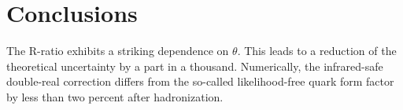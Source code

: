 \section{Conclusions}\label{sec:conclusions}

The R-ratio exhibits a striking dependence on $\theta$. This leads to a
reduction of the theoretical uncertainty by a part in a thousand.
Numerically, the infrared-safe double-real correction differs from the
so-called likelihood-free quark form factor by less than two percent
after hadronization.

